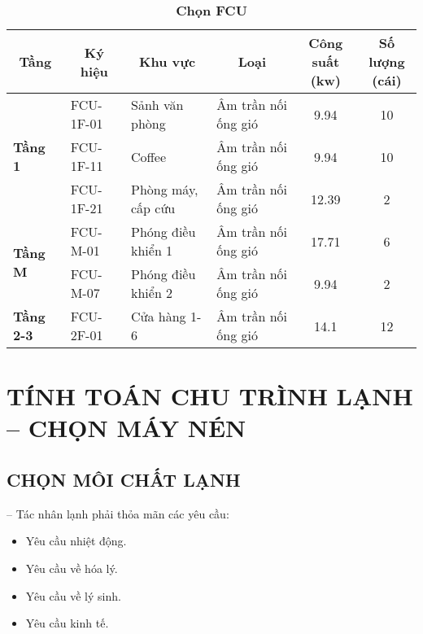 \newpage
\begin{table}[H]
	\centering
	\caption{\textbf{Chọn FCU}}
	\begin{adjustbox}{width=\textwidth}
	\begin{tabular}{|l|l|l|p{5.3em}|c|c|}
		\hline
		\multicolumn{1}{|c|}{\textbf{Tầng}} & \multicolumn{1}{c|}{\textbf{Ký hiệu}} & \multicolumn{1}{c|}{\textbf{Khu vực}} & \multicolumn{1}{c|}{\textbf{Loại}} & \multicolumn{1}{p{4.85em}|}{\textbf{Công suất\newline{}(kw)}} & \multicolumn{1}{p{4.25em}|}{\textbf{Số lượng \newline{}(cái)}} \bigstrut\\
		\hline
		\multirow{3}[6]{*}{\textbf{Tầng 1}} & FCU-1F-01 & Sảnh văn phòng & Âm trần nối\newline{} ống gió & 9.94  & 10 \bigstrut\\
		\cline{2-6}      & FCU-1F-11 & Coffee & Âm trần nối \newline{}ống gió & 9.94  & 10 \bigstrut\\
		\cline{2-6}      & FCU-1F-21 & \multicolumn{1}{p{8.55em}|}{Phòng máy, \newline{}cấp cứu} & Âm trần nối \newline{}ống gió & 12.39 & 2 \bigstrut\\
		\hline
		\multirow{2}[4]{*}{\textbf{Tầng M}} & FCU-M-01 & Phóng điều khiển 1 & Âm trần nối \newline{}ống gió & 17.71 & 6 \bigstrut\\
		\cline{2-6}      & FCU-M-07 & Phóng điều khiển 2 & Âm trần nối \newline{}ống gió & 9.94  & 2 \bigstrut\\
		\hline
		\textbf{Tầng 2-3} & FCU-2F-01 & Cửa hàng 1-6 & Âm trần nối \newline{}ống gió & 14.1  & 12 \bigstrut\\
		\hline
	\end{tabular}%
	\end{adjustbox}
\end{table}

\section{TÍNH TOÁN CHU TRÌNH LẠNH – CHỌN MÁY NÉN}
\subsection{CHỌN MÔI CHẤT LẠNH}
-- Tác nhân lạnh phải thỏa mãn các yêu cầu:
\begin{itemize}
	\item Yêu cầu nhiệt động.
	\item Yêu cầu về hóa lý.
	\item Yêu cầu về lý sinh.
	\item Yêu cầu kinh tế.
\end{itemize}

